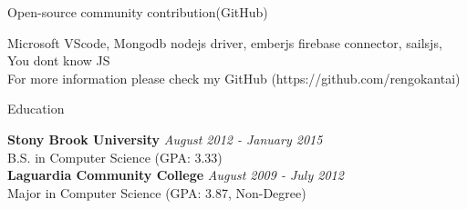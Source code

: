 \documentclass{resume} %
\begin{document}
\begin{rSection}{Open-source community contribution(GitHub)}

Microsoft VScode, Mongodb nodejs driver, emberjs firebase connector, sailsjs, You dont know JS \\
For more information please check my GitHub (https://github.com/rengokantai)


\end{rSection}














\begin{rSection}{Education}

{\bf Stony Brook University} \hfill {\em August 2012 - January 2015} \\ 
B.S. in Computer Science (GPA: 3.33)  \\
{\bf Laguardia Community College} \hfill {\em August 2009 - July 2012} \\ 
Major in Computer Science (GPA: 3.87, Non-Degree) 
\end{rSection}
\end{document}
